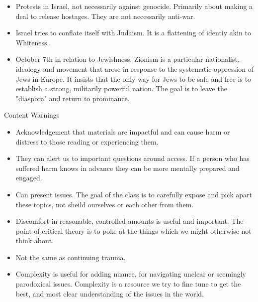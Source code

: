 \documentclass{report}
\begin{document}
\begin{description}
\begin{mdframed}
\begin{itemize}
                \item Protests in Israel, not necessarily against genocide. Primarily
                    about making a deal to release hostages. They are not necessarily
                    anti-war.

                \item Israel tries to conflate itself with Judaism. It is a flattening of
                    identiy akin to Whiteness.

                \item October 7th in relation to Jewishness. Zionism is a particular
                    nationalist, ideology and movement that arose in response to the
                    systematic oppression of Jews in Europe. It insists that the only
                    way for Jews to be safe and free is to establish a strong, militarily
                    powerful nation. The goal is to leave the "diaspora" and return to
                    prominance.
            \end{itemize}
        \end{mdframed}

    \item Content Warnings
        \begin{itemize}
            \item Acknowledgement that materials are impactful and can cause harm or distress
                to those reading or experiencing them.

            \item They can alert us to important questions around access. If a person who
                has suffered harm knows in advance they can be more mentally prepared
                and engaged.

            \item Can present issues. The goal of the class is to carefully expose and
                pick apart these topics, not sheild ourselves or each other from them.

            \item Discomfort in reasonable, controlled amounts is useful and important.
                The point of critical theory is to poke at the things which we might
                otherwise not think about.

            \item Not the same as continuing trauma.

            \item Complexity is useful for adding nuance, for navigating unclear
                or seemingly parodoxical issues. Complexity is a resource we try
                to fine tune to get the best, and most clear understanding of the
                issues in the world.
        \end{itemize}


\end{description}
\end{document}
